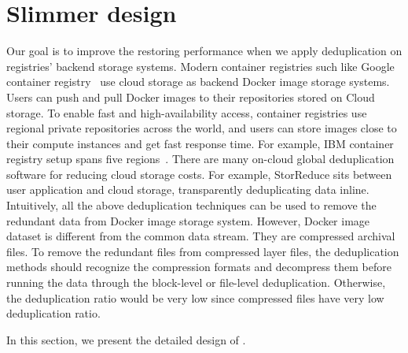\section{Slimmer design}
\label{sec:slimmer}

%



Our goal is to improve the restoring performance when we apply deduplication on registries' backend storage systems.
Modern container registries such like Google container registry~\cite{googleregistry} use cloud storage as backend Docker image storage systems. Users can push and pull Docker images to their repositories stored on Cloud storage. To enable fast and high-availability access, container registries use regional private repositories across the world, and users can store images close to their compute instances and get fast response time. For example, IBM container registry setup spans five regions~\cite{anwarfast}. 
There are many on-cloud global deduplication software for reducing cloud storage costs. For example, StorReduce sits between user application and cloud storage, transparently deduplicating data inline.
Intuitively, all the above deduplication techniques can be used to remove the redundant data from Docker image storage system.  
However, Docker image dataset is different from the common data stream. They are compressed archival files.
To remove the redundant files from compressed layer files, the deduplication methods should recognize the compression formats and decompress them before running the data through the block-level or file-level deduplication. Otherwise, the deduplication ratio would be very low since compressed files have very low deduplication ratio. 

In this section, we present the detailed design of \sysname.










